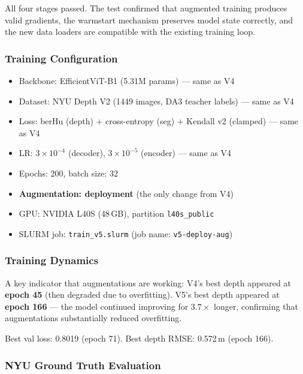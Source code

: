 \documentclass[11pt,a4paper]{article}
\begin{document}
All four stages passed. The test confirmed that augmented training produces
valid gradients, the warmstart mechanism preserves model state correctly,
and the new data loaders are compatible with the existing training loop.

\subsubsection{Training Configuration}

\begin{itemize}[nosep]
  \item Backbone: EfficientViT-B1 (5.31M params) --- same as V4
  \item Dataset: NYU Depth V2 (1449 images, DA3 teacher labels) --- same as V4
  \item Loss: berHu (depth) + cross-entropy (seg) + Kendall v2 (clamped) --- same as V4
  \item LR: $3 \times 10^{-4}$ (decoder), $3 \times 10^{-5}$ (encoder) --- same as V4
  \item Epochs: 200, batch size: 32
  \item \textbf{Augmentation: deployment} (the only change from V4)
  \item GPU: NVIDIA L40S (48\,GB), partition \texttt{l40s\_public}
  \item SLURM job: \texttt{train\_v5.slurm} (job name: \texttt{v5-deploy-aug})
\end{itemize}

\subsubsection{Training Dynamics}

A key indicator that augmentations are working: V4's best depth appeared at
\textbf{epoch 45} (then degraded due to overfitting). V5's best depth appeared
at \textbf{epoch 166} --- the model continued improving for $3.7\times$ longer,
confirming that augmentations substantially reduced overfitting.

Best val loss: 0.8019 (epoch 71). Best depth RMSE: 0.572\,m (epoch 166).

\subsubsection{NYU Ground Truth Evaluation}
\end{document}

